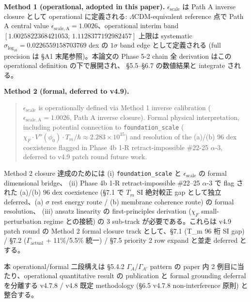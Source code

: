 \documentclass[11pt,a4paper]{ltjsarticle}
\newcommand{\Tm}{T_{m}}
\begin{document}
\medskip\noindent\textbf{Method 1 (operational, adopted in this paper).}\quad
$\epsilon_{\mathrm{scale}}$ は Path A inverse closure として operational
に定義される:
$\Lambda$CDM-equivalent reference 点で Path A central value
$\epsilon_{\mathrm{scale,A}} = 1.0026$、operational interim band
$[1.0025822368421053,\, 1.1128377192982457]$ 上限は systematic
$\sigma_{\log_{10}} = 0.0226559158703769$ dex の $1\sigma$ band edge
として定義される (full precision は \S A1 末尾参照)。本論文の Phase 5-2
chain 全 derivation はこの operational definition の下で展開され、
\S 5.5--\S 6.7 の数値結果と integrate される。

\medskip\noindent\textbf{Method 2 (formal, deferred to v4.9).}

\begin{quote}
$\epsilon_{\mathrm{scale}}$ is operationally defined via Method 1
inverse calibration ($\epsilon_{\mathrm{scale,A}} = 1.0026$, Path A
inverse closure). Formal physical interpretation, including potential
connection to \texttt{foundation\_scale}
($\chi_F \cdot V''(\phi_0) \cdot T_m / \hbar \approx 2.283 \times 10^{35}$)
and resolution of the (a)/(b) 96 dex coexistence flagged in Phase 4b 1-R
retract-impossible \#22-25 $\alpha$-3, deferred to v4.9 patch round
future work.
\end{quote}

\noindent
Method 2 closure 達成のためには (i) \texttt{foundation\_scale} と
$\epsilon_{\mathrm{scale}}$ の formal dimensional bridge、
(ii) Phase 4b 1-R retract-impossible \#22--25 $\alpha$-3 で flag された
(a)/(b) 96 dex coexistence (\S 7.1 で $\Tm$ SI 絶対較正 gap として独立
deferred、(a) $\sigma$ rest energy route / (b) membrane coherence route)
の formal resolution、
(iii) ansatz linearity の first-principles derivation
($\chi_F$ small-perturbation regime との接続)
の 3 sub-track が必要である。これらは v4.9 patch round の Method 2
formal closure track として、\S 7.1 (T\_m 96 桁 SI gap) / \S 7.2
($\Gamma_{\mathrm{actual}}$ + 11\%/5.5\% 統一) / \S 7.5 priority 2 row
expand と並走 deferred とする。

\noindent
本 operational/formal 二段構えは \S 5.4.2 $\Gamma_A$/$\Gamma_{A'}$ pattern
の paper 内 2 例目に当たり、operational quantitative result の publication
と formal grounding deferral を分離する v4.7.8 / v4.8 既定 methodology
(\S 6.5 v4.7.8 non-interference 原則) と整合する。


\end{document}
